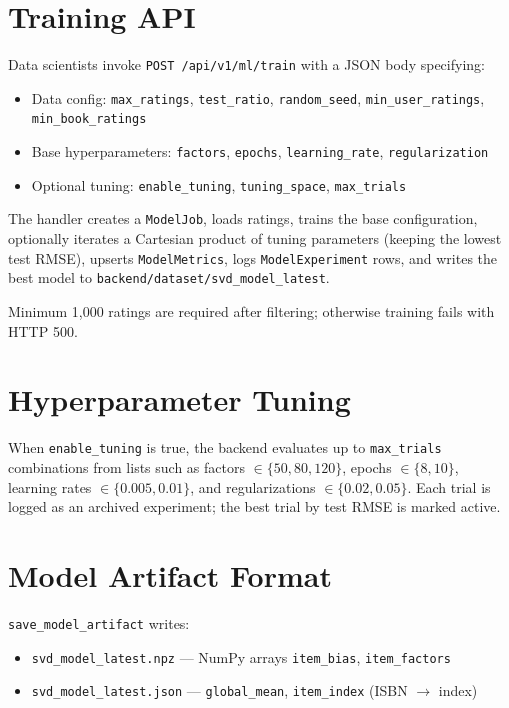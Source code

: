 \documentclass[12pt,a4paper]{report}
\begin{document}
\section{Training API}

Data scientists invoke \texttt{POST /api/v1/ml/train} with a JSON body specifying:
\begin{itemize}
    \item Data config: \texttt{max\_ratings}, \texttt{test\_ratio}, \texttt{random\_seed}, \texttt{min\_user\_ratings}, \texttt{min\_book\_ratings}
    \item Base hyperparameters: \texttt{factors}, \texttt{epochs}, \texttt{learning\_rate}, \texttt{regularization}
    \item Optional tuning: \texttt{enable\_tuning}, \texttt{tuning\_space}, \texttt{max\_trials}
\end{itemize}

The handler creates a \texttt{ModelJob}, loads ratings, trains the base configuration, optionally iterates a Cartesian product of tuning parameters (keeping the lowest test RMSE), upserts \texttt{ModelMetrics}, logs \texttt{ModelExperiment} rows, and writes the best model to \texttt{backend/dataset/svd\_model\_latest}.

Minimum 1,000 ratings are required after filtering; otherwise training fails with HTTP 500.

\section{Hyperparameter Tuning}

When \texttt{enable\_tuning} is true, the backend evaluates up to \texttt{max\_trials} combinations from lists such as factors $\in \{50,80,120\}$, epochs $\in \{8,10\}$, learning rates $\in \{0.005,0.01\}$, and regularizations $\in \{0.02,0.05\}$. Each trial is logged as an archived experiment; the best trial by test RMSE is marked active.

\section{Model Artifact Format}

\texttt{save\_model\_artifact} writes:
\begin{itemize}
    \item \texttt{svd\_model\_latest.npz} --- NumPy arrays \texttt{item\_bias}, \texttt{item\_factors}
    \item \texttt{svd\_model\_latest.json} --- \texttt{global\_mean}, \texttt{item\_index} (ISBN $\rightarrow$ index)
\end{itemize}
\end{document}
